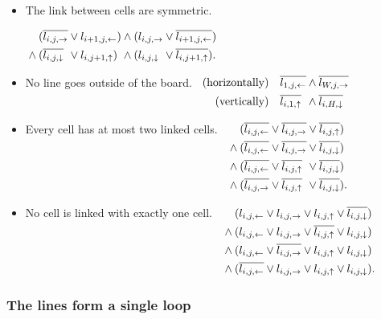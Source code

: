 \documentclass[a4paper]{article}
\newcommand{\N}[1]{\overline{#1\vphantom{l}}}
\renewcommand{\L}{{\leftarrow}}
\newcommand{\R}{{\rightarrow}}
\newcommand{\U}{{\uparrow}}
\newcommand{\D}{{\downarrow}}
\begin{document}
\begin{itemize}
\item The link between cells are symmetric.
  \par\qquad
  $\begin{alignedat}[t]{4}
   & (\N{l_{i,j,\R}} &&\lor   l_{i+1,j,\L})  &&\land
     (   l_{i,j,\R}  &&\lor\N{l_{i+1,j,\L}}) \\ {}\land{}
   & (\N{l_{i,j,\D}} &&\lor   l_{i,j+1,\U})  &&\land
     (   l_{i,j,\D}  &&\lor\N{l_{i,j+1,\U}}).
  \end{alignedat}$

\item No line goes outside of the board. \
  $\begin{alignedat}[t]{3}
   \text{(horizontally)}\quad &
   \N{l_{1,j,\L}} &&\land \N{l_{W,j,\R}} \\
   \text{(vertically)}\quad &
   \N{l_{i,1,\U}} &&\land \N{l_{i,H,\D}}
   \end{alignedat}$

\item
  Every cell has at most two linked cells.  \
  $\begin{alignedat}[t]{3}
   & (\N{l_{i,j,\L}}&&\lor\N{l_{i,j,\R}}&&\lor\N{l_{i,j,\U}}) \\ {}\land{}
   & (\N{l_{i,j,\L}}&&\lor\N{l_{i,j,\R}}&&\lor\N{l_{i,j,\D}}) \\ {}\land{}
   & (\N{l_{i,j,\L}}&&\lor\N{l_{i,j,\U}}&&\lor\N{l_{i,j,\D}}) \\ {}\land{}
   & (\N{l_{i,j,\R}}&&\lor\N{l_{i,j,\U}}&&\lor\N{l_{i,j,\D}}).
  \end{alignedat}$

\item
  No cell is linked with exactly one cell. \
  $\begin{alignedat}[t]{1}
   &(l_{i,j,\L}\lor l_{i,j,\R}\lor l_{i,j,\U}\lor\N{l_{i,j,\D}})\\{}\land{}
   &(l_{i,j,\L}\lor l_{i,j,\R}\lor\N{l_{i,j,\U}}\lor l_{i,j,\D})\\{}\land{}
   &(l_{i,j,\L}\lor\N{l_{i,j,\R}}\lor l_{i,j,\U}\lor l_{i,j,\D})\\{}\land{}
   &(\N{l_{i,j,\L}}\lor l_{i,j,\R}\lor l_{i,j,\U}\lor l_{i,j,\D}).
  \end{alignedat}$
\end{itemize}

\subsubsection{The lines form a single loop}
\end{document}

